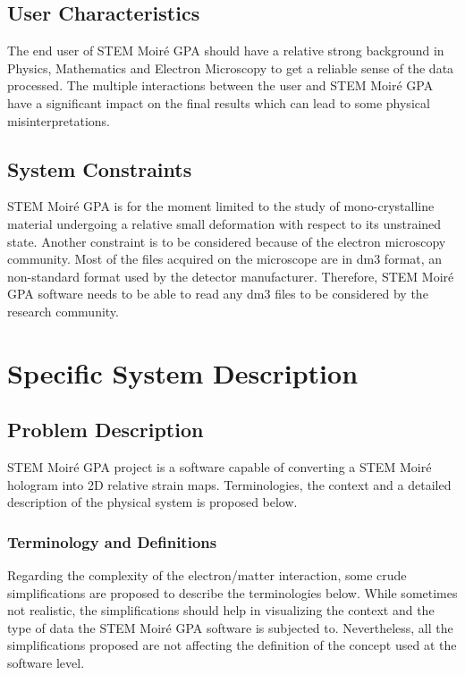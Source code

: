 \documentclass[12pt]{article}
\newcommand{\progname}{STEM Moir{\'e} GPA}
\begin{document}
\subsection{User Characteristics} \label{SecUserCharacteristics}

The end user of \progname{} should have a relative strong background in Physics, Mathematics and Electron Microscopy to get a reliable sense of the data processed. The multiple interactions between the user and \progname{} have a significant impact on the final results which can lead to some physical misinterpretations. 

\subsection{System Constraints}

\progname{} is for the moment limited to the study of mono-crystalline material undergoing a relative small deformation with respect to its unstrained state. Another constraint is to be considered because of the electron microscopy community. Most of the files acquired on the microscope are in dm3 format, an non-standard format used by the detector manufacturer. Therefore, \progname{} software needs to be able to read any dm3 files to be considered by the research community.

\section{Specific System Description}
\subsection{Problem Description} \label{Sec_pd}

STEM Moir{\'e} GPA project is a software capable of converting a STEM Moir{\'e} 
hologram into 2D relative strain maps. Terminologies, the context and a detailed description of the physical system is proposed below.

\subsubsection{Terminology and Definitions}

Regarding the complexity of the electron/matter interaction, some crude 
simplifications are proposed to describe the terminologies below. While 
sometimes not realistic, the simplifications should help in visualizing the 
context and the type of data the STEM Moir{\'e} GPA software is subjected to. Nevertheless, all the simplifications proposed are not affecting the definition of the concept used at the software level.
\end{document}
